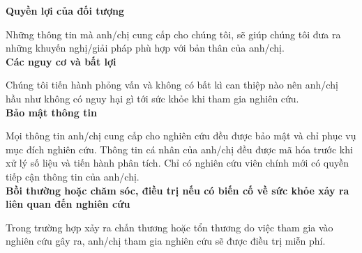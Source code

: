 \noindent
\textbf{Quyền lợi của đối tượng}\par
\vspace{3pt}
\quad Những thông tin mà anh/chị cung cấp cho chúng tôi, sẽ giúp chúng tôi đưa ra những khuyến nghị/giải pháp phù hợp với bản thân của anh/chị.\\
\vspace{4pt}
\textbf{Các nguy cơ và bất lợi}\par
\vspace{2pt}
\quad Chúng tôi tiến hành phỏng vấn và không có bất kì can thiệp nào nên anh/chị hầu như không có nguy hại gì tới sức khỏe khi tham gia nghiên cứu.\\
\vspace{4pt}
\textbf{Bảo mật thông tin}\par
\vspace{2pt}
\quad Mọi thông tin anh/chị cung cấp cho nghiên cứu đều được bảo mật và chỉ phục vụ mục đích nghiên cứu. Thông tin cá nhân của anh/chị đều được mã hóa trước khi xử lý số liệu và tiến hành phân tích. Chỉ có nghiên cứu viên chính mới có quyền tiếp cận thông tin của anh/chị.\\
\vspace{4pt}
\textbf{Bồi thường hoặc chăm sóc, điều trị nếu có biến cố về sức khỏe xảy ra liên quan đến nghiên cứu}\par
\vspace{2pt}
\quad Trong trường hợp xảy ra chấn thương hoặc tổn thương do việc tham gia vào nghiên cứu gây ra, anh/chị tham gia nghiên cứu sẽ được điều trị miễn phí.

